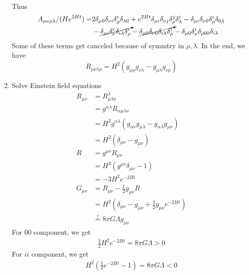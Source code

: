 \begin{enumerate}[label=(\alph*)]
\begin{align*}
      \end{align*}
      Thus 
      \begin{align*}
         A_{\mu\nu\rho\lambda}/(H e^{2Ht}) = &2\delta_{\mu 0} \delta_{\nu i} \delta^{i}_{\rho} \delta_{\lambda 0} + e^{2Ht} \delta_{\mu i} \delta_{\nu j} \delta^j_{\rho} \delta^{i}_\lambda - \delta_{\mu i } \delta_{\nu 0} \delta^i_\rho \delta_{0 \lambda} \\
                                             &- \cancelto{}{\delta_{\mu i} \delta^i_{\nu}  \delta_{i \lambda} \delta^i_{\rho}} - \cancelto{}{\delta_{\mu 0} \delta_{\nu 0} \delta_{i \lambda} \delta^i_{\rho}} - \delta_{\mu 0}\delta^i_{\nu} \delta_{\rho0 0 }\delta_{i \lambda}
      \end{align*}
      Some of these terms get canceled because of symmtry in $\rho, \lambda$. In the end, we have
      \begin{equation}
         R_{\mu\nu\lambda \rho} = H^2 (g_{\mu\rho} g_{\nu\lambda} - g_{\mu\lambda} g_{\nu\rho})
      \end{equation}
   \item  Solve Einstein field equations
      \begin{align*}
         R_{\mu\nu} &= R^\lambda_{\mu \lambda \nu} \\
                    &= g^{\alpha \lambda } R_{\alpha \mu \lambda \nu} \\
                    &= H^2 g^{\alpha \lambda} (g_{\alpha \nu} g_{\mu \lambda} - g_{\alpha \lambda} g_{\mu\nu}) \\
                    &= H^2 (\delta_{\mu\nu} - g_{\mu\nu}) \\
         R &= g^{\mu\nu}R_{\mu\nu}\\
                    &= H^2 (g^{\mu\nu}\delta_{\mu\nu} - 1) \\
                                  &= -3 H^2 e^{-2Ht} \\
         G_{\mu\nu} &= R_{\mu\nu} - \frac{1}{2} g_{\mu\nu}R \\
                    &= H^2 (\delta_{\mu\nu} - g_{\mu\nu} + \frac{3}{2} g_{\mu\nu}e^{-2Ht}) \\
                    & \stackrel{!}{=} 8 \pi G \Lambda g_{\mu\nu}
      \end{align*}
      For $00$ component, we get
      \begin{align}
         \frac{3}{2} H^2 e^{-2Ht} = 8\pi G \Lambda  > 0
      \end{align}
      For $ii$ component, we get
      \begin{align}
         H^2 \left(\frac{1}{2} e^{-2Ht} - 1 \right) = 8 \pi G \Lambda < 0
      \end{align}
\end{enumerate}
